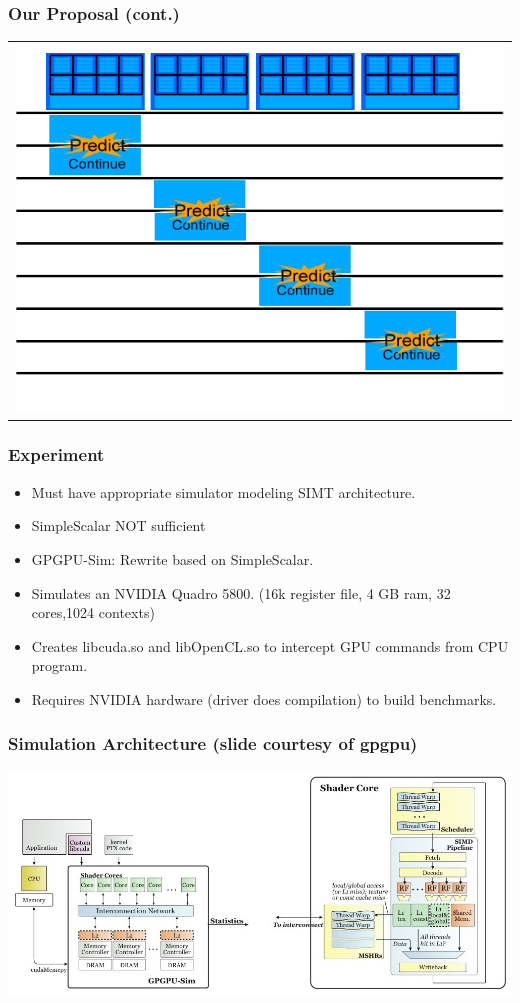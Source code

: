 \documentclass{beamer}
\begin{document}
\begin{frame}
	\frametitle{Our Proposal (cont.)}
	\begin{tabular}{c}
		\includegraphics[width=.75\textwidth]{GPU-predict-context.jpg}
	\end{tabular}
\end{frame}

\begin{frame}
   \frametitle{Experiment}
   \begin{itemize}
    \item Must have appropriate simulator modeling SIMT architecture.
    \item SimpleScalar NOT sufficient
    \item GPGPU-Sim: Rewrite based on SimpleScalar.
    \item Simulates an NVIDIA Quadro 5800. (16k register file, 4 GB ram, 32 cores,1024 contexts)
    \item Creates libcuda.so and libOpenCL.so to intercept GPU commands from CPU program.
    \item Requires NVIDIA hardware (driver does compilation) to build benchmarks.
   \end{itemize}
\end{frame}

\begin{frame}
 \frametitle{Simulation Architecture (slide courtesy of gpgpu)}
  \includegraphics[width=.9\textwidth]{uarch.jpg}

\end{frame}
\end{document}
